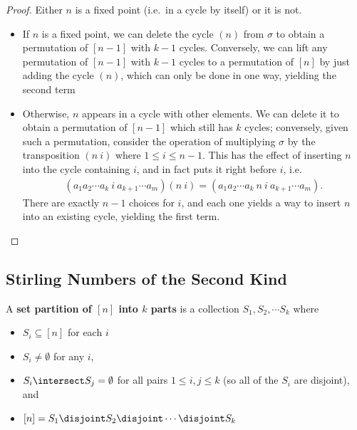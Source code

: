 \begin{proof}

Either \(n\) is a fixed point (i.e.~in a cycle by itself) or it is not.

\begin{itemize}
\item
  If \(n\) is a fixed point, we can delete the cycle \((n)\) from
  \(\sigma\) to obtain a permutation of \([n-1]\) with \(k-1\) cycles.
  Conversely, we can lift any permutation of \([n-1]\) with \(k-1\)
  cycles to a permutation of \([n]\) by just adding the cycle \((n)\),
  which can only be done in one way, yielding the second term
\item
  Otherwise, \(n\) appears in a cycle with other elements. We can delete
  it to obtain a permutation of \([n-1]\) which still has \(k\) cycles;
  conversely, given such a permutation, consider the operation of
  multiplying \(\sigma\) by the transposition \((n~i)\) where
  \(1\leq i\leq n-1\). This has the effect of inserting \(n\) into the
  cycle containing \(i\), and in fact puts it right before \(i\), i.e.
  \begin{align*}
  (a_1 a_2 \cdots a_{k}~ i ~ a_{k+1} \cdots a_m)(n~i) =  (a_1 a_2 \cdots a_{k}~ n ~ i ~ a_{k+1} \cdots a_m).
  \end{align*} There are exactly \(n-1\) choices for \(i\), and each one
  yields a way to insert \(n\) into an existing cycle, yielding the
  first term.
\end{itemize}

\end{proof}

\hypertarget{stirling-numbers-of-the-second-kind}{%
\subsection{Stirling Numbers of the Second
Kind}\label{stirling-numbers-of-the-second-kind}}

A \textbf{set partition of \([n]\) into \(k\) parts} is a collection
\(S_1, S_2, \cdots S_k\) where

\begin{itemize}
\tightlist
\item
  \(S_i \subseteq [n]\) for each \(i\)
\item
  \(S_i \neq \emptyset\) for any \(i\),
\item
  \(S_i \intersect S_j = \emptyset\) for all pairs \(1 \leq i,j \leq k\)
  (so all of the \(S_i\) are disjoint), and
\item
  \([n] = S_1 \disjoint S_2 \disjoint \cdots \disjoint S_k\)
\end{itemize}

